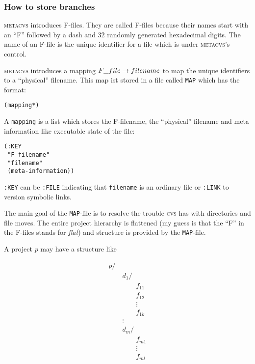 \documentclass[fleqn, 10pt, a4paper]{report} \usepackage{amssymb}
\begin{document}
\subsubsection{How to store branches}

\textsc{metacvs} introduces F-files. They are called F-files because
their names start with an ``F'' followed by a dash and 32 randomly
generated hexadecimal digits. The name of an F-file is the unique
identifier for a file which is under \textsc{metacvs}'s control.

\textsc{metacvs} introduces a mapping $\mathnormal{F\_file}
\rightarrow filename$ to map the unique identifiers to a ``physical''
filename. This map ist stored in a file called \texttt{MAP} which has
the format:

\begin{verbatim}
(mapping*)
\end{verbatim}

A \texttt{mapping} is a list which stores the F-filename, the
``physical'' filename and meta information like executable state of
the file:

\begin{verbatim}
(:KEY
 "F-filename"
 "filename"
 (meta-information))
\end{verbatim}

\texttt{:KEY} can be \texttt{:FILE} indicating that \texttt{filename}
is an ordinary file or \texttt{:LINK} to version symbolic links.

The main goal of the \texttt{MAP}-file is to resolve the trouble
\textsc{cvs} has with directories and file moves. The entire project
hierarchy is flattened (my guess is that the ``F'' in the F-files
stands for \emph{flat}) and structure is provided by the
\texttt{MAP}-file.

A project $p$ may have a structure like

\begin{displaymath}
  \begin{array}{l}
    p/ \\
    \qquad d_1/ \\
    \qquad\qquad f_{11} \\
    \qquad\qquad f_{12} \\
    \qquad\qquad \vdots \\
    \qquad\qquad f_{1k} \\
    \qquad \vdots \\
    \qquad d_m/ \\
    \qquad\qquad f_{m1} \\
    \qquad\qquad \vdots \\
    \qquad\qquad f_{ml}
  \end{array}
\end{displaymath}
\end{document}
